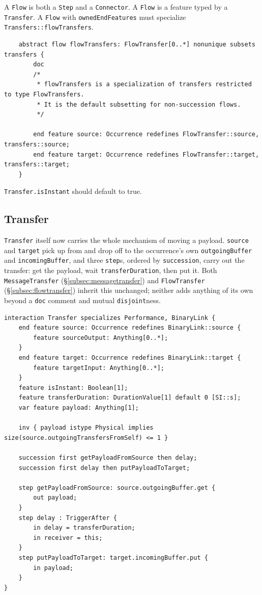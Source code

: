 
\label{sec:flows}

\pn  A \texttt{Flow} is both a \texttt{Step} and a \texttt{Connector}.  A \texttt{Flow} is a feature typed by a \texttt{Transfer}.
A \texttt{Flow} with \texttt{ownedEndFeatures} must specialize \texttt{Transfers::flowTransfers}.
\ecaption{}
\begin{lstlisting}
    abstract flow flowTransfers: FlowTransfer[0..*] nonunique subsets transfers {
        doc
        /*
         * flowTransfers is a specialization of transfers restricted to type FlowTransfers.
         * It is the default subsetting for non-succession flows.
         */

        end feature source: Occurrence redefines FlowTransfer::source, transfers::source;
        end feature target: Occurrence redefines FlowTransfer::target, transfers::target;
    }
\end{lstlisting}

\pn \texttt{Transfer.isInstant} should default to true.


\subsection{Transfer}\label{subsec:transfer}

\pn \texttt{Transfer} itself now carries the whole mechanism of moving a payload.  \texttt{source}
and \texttt{target} pick up from and drop off to the occurrence's own \texttt{outgoingBuffer} and
\texttt{incomingBuffer}, and three \texttt{step}s, ordered by \texttt{succession}, carry out the
transfer: get the payload, wait \texttt{transferDuration}, then put it.  Both
\texttt{MessageTransfer} (\S\ref{subsec:messagetransfer}) and \texttt{FlowTransfer}
(\S\ref{subsec:flowtransfer}) inherit this unchanged; neither adds anything of its own beyond a
\texttt{doc} comment and mutual \texttt{disjoint}ness.

\begin{lstlisting}
interaction Transfer specializes Performance, BinaryLink {
	end feature source: Occurrence redefines BinaryLink::source {
		feature sourceOutput: Anything[0..*];
	}
	end feature target: Occurrence redefines BinaryLink::target {
		feature targetInput: Anything[0..*];
	}
	feature isInstant: Boolean[1];
	feature transferDuration: DurationValue[1] default 0 [SI::s];
	var feature payload: Anything[1];

	inv { payload istype Physical implies size(source.outgoingTransfersFromSelf) <= 1 }

	succession first getPayloadFromSource then delay;
	succession first delay then putPayloadToTarget;

	step getPayloadFromSource: source.outgoingBuffer.get {
		out payload;
	}
	step delay : TriggerAfter {
		in delay = transferDuration;
		in receiver = this;
	}
	step putPayloadToTarget: target.incomingBuffer.put {
		in payload;
	}
}
\end{lstlisting}

